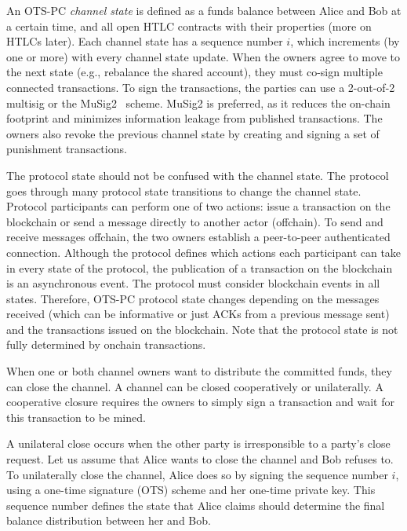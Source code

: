 \documentclass[11pt,a4paper]{article}
\begin{document}
An OTS-PC \textit{channel state} is defined as a funds balance between Alice and Bob at a certain time, and all open HTLC contracts with their properties (more on HTLCs later). Each channel state has a sequence number $i$, which increments (by one or more) with every channel state update. When the owners agree to move to the next state (e.g., rebalance the shared account), they must co-sign multiple connected transactions. To sign the transactions, the parties can use a 2-out-of-2 multisig or the MuSig2~\cite{musig2} scheme. MuSig2 is preferred, as it reduces the on-chain footprint and minimizes information leakage from published transactions. The owners also revoke the previous channel state by creating and signing a set of punishment transactions. 

The protocol state should not be confused with the channel state. The protocol goes through many protocol state transitions to change the channel state. Protocol participants can perform one of two actions: issue a transaction on the blockchain or send a message directly to another actor (offchain). To send and receive messages offchain, the two owners establish a peer-to-peer authenticated connection. Although the protocol defines which actions each participant can take in every state of the protocol, the publication of a transaction on the blockchain is an asynchronous event. The protocol must consider blockchain events in all states. Therefore, OTS-PC protocol state changes depending on the messages received (which can be informative or just ACKs from a previous message sent) and the transactions issued on the blockchain. Note that the protocol state is not fully determined by onchain transactions.

When one or both channel owners want to distribute the committed funds, they can close the channel. A channel can be closed cooperatively or unilaterally. A cooperative closure requires the owners to simply sign a transaction and wait for this transaction to be mined.

A unilateral close occurs when the other party is irresponsible to a party's close request. Let us assume that Alice wants to close the channel and Bob refuses to.
To unilaterally close the channel, Alice does so by signing the sequence number $i$, using a one-time signature (OTS) scheme and her one-time private key. This sequence number defines the state that Alice claims should determine the final balance distribution between her and Bob. 
\end{document}
